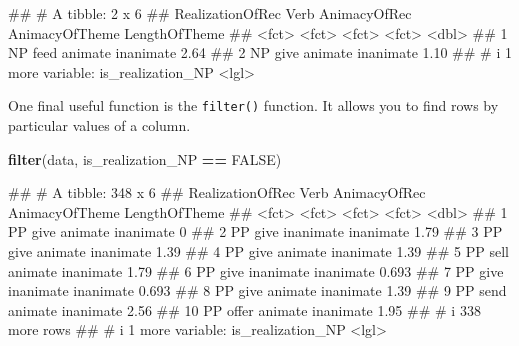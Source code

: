 \documentclass[
]{book}
\newenvironment{Shaded}{\begin{snugshade}}{\end{snugshade}}
\newcommand{\ConstantTok}[1]{\textcolor[rgb]{0.56,0.35,0.01}{#1}}
\newcommand{\FunctionTok}[1]{\textcolor[rgb]{0.13,0.29,0.53}{\textbf{#1}}}
\newcommand{\NormalTok}[1]{#1}
\newcommand{\SpecialCharTok}[1]{\textcolor[rgb]{0.81,0.36,0.00}{\textbf{#1}}}
\begin{document}
\begin{Shaded}
\begin{Highlighting}[]
\NormalTok{\#\# \# A tibble: 2 x 6}
\NormalTok{\#\#   RealizationOfRec Verb  AnimacyOfRec AnimacyOfTheme LengthOfTheme}
\NormalTok{\#\#   \textless{}fct\textgreater{}            \textless{}fct\textgreater{} \textless{}fct\textgreater{}        \textless{}fct\textgreater{}                  \textless{}dbl\textgreater{}}
\NormalTok{\#\# 1 NP               feed  animate      inanimate               2.64}
\NormalTok{\#\# 2 NP               give  animate      inanimate               1.10}
\NormalTok{\#\# \# i 1 more variable: is\_realization\_NP \textless{}lgl\textgreater{}}
\end{Highlighting}
\end{Shaded}

One final useful function is the \texttt{filter()} function. It allows you to find rows by particular values of a column.

\begin{Shaded}
\begin{Highlighting}[]
\FunctionTok{filter}\NormalTok{(data, is\_realization\_NP }\SpecialCharTok{==} \ConstantTok{FALSE}\NormalTok{)}
\end{Highlighting}
\end{Shaded}

\begin{Shaded}
\begin{Highlighting}[]
\NormalTok{\#\# \# A tibble: 348 x 6}
\NormalTok{\#\#    RealizationOfRec Verb  AnimacyOfRec AnimacyOfTheme LengthOfTheme}
\NormalTok{\#\#    \textless{}fct\textgreater{}            \textless{}fct\textgreater{} \textless{}fct\textgreater{}        \textless{}fct\textgreater{}                  \textless{}dbl\textgreater{}}
\NormalTok{\#\#  1 PP               give  animate      inanimate              0    }
\NormalTok{\#\#  2 PP               give  inanimate    inanimate              1.79 }
\NormalTok{\#\#  3 PP               give  animate      inanimate              1.39 }
\NormalTok{\#\#  4 PP               give  animate      inanimate              1.39 }
\NormalTok{\#\#  5 PP               sell  animate      inanimate              1.79 }
\NormalTok{\#\#  6 PP               give  inanimate    inanimate              0.693}
\NormalTok{\#\#  7 PP               give  inanimate    inanimate              0.693}
\NormalTok{\#\#  8 PP               give  animate      inanimate              1.39 }
\NormalTok{\#\#  9 PP               send  animate      inanimate              2.56 }
\NormalTok{\#\# 10 PP               offer animate      inanimate              1.95 }
\NormalTok{\#\# \# i 338 more rows}
\NormalTok{\#\# \# i 1 more variable: is\_realization\_NP \textless{}lgl\textgreater{}}
\end{Highlighting}
\end{Shaded}
\end{document}
